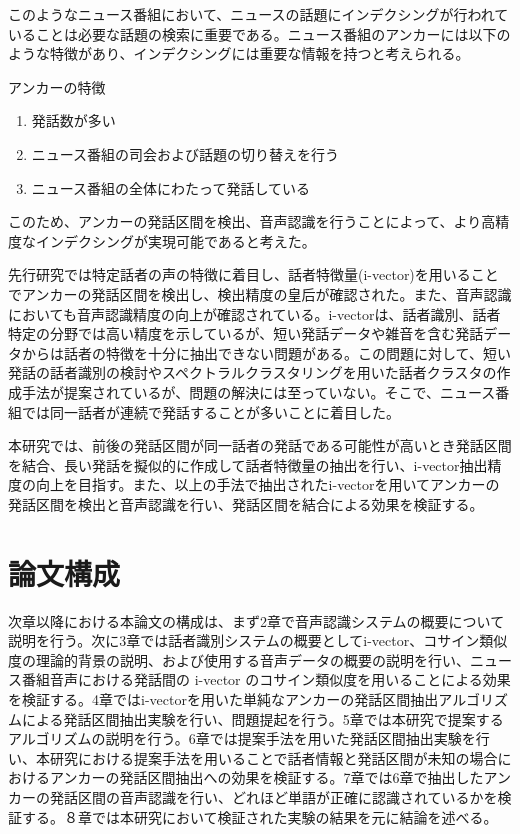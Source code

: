 このようなニュース番組において、ニュースの話題にインデクシングが行われていることは必要な話題の検索に重要である。ニュース番組のアンカーには以下のような特徴があり、インデクシングには重要な情報を持つと考えられる。\newline

アンカーの特徴
\begin{enumerate}
\item 発話数が多い
\item ニュース番組の司会および話題の切り替えを行う
\item ニュース番組の全体にわたって発話している
\end{enumerate}\par

このため、アンカーの発話区間を検出、音声認識を行うことによって、より高精度なインデクシングが実現可能であると考えた。\par
先行研究では特定話者の声の特徴に着目し、話者特徴量(i-vector)を用いることでアンカーの発話区間を検出し、検出精度の皇后が確認された。また、音声認識においても音声認識精度の向上が確認されている。i-vectorは、話者識別、話者特定の分野では高い精度を示しているが、短い発話データや雑音を含む発話データからは話者の特徴を十分に抽出できない問題がある。この問題に対して、短い発話の話者識別の検討\cite{panaiv}やスペクトラルクラスタリングを用いた話者クラスタの作成手法\cite{spectroclus}が提案されているが、問題の解決には至っていない。そこで、ニュース番組では同一話者が連続で発話することが多いことに着目した。\par
本研究では、前後の発話区間が同一話者の発話である可能性が高いとき発話区間を結合、長い発話を擬似的に作成して話者特徴量の抽出を行い、i-vector抽出精度の向上を目指す。また、以上の手法で抽出されたi-vectorを用いてアンカーの発話区間を検出と音声認識を行い、発話区間を結合による効果を検証する。

\section{論文構成}
次章以降における本論文の構成は、まず2章で音声認識システムの概要について説明を行う。次に3章では話者識別システムの概要としてi-vector、コサイン類似度の理論的背景の説明、および使用する音声データの概要の説明を行い、ニュース番組音声における発話間の i-vector のコサイン類似度を用いることによる効果を検証する。4章ではi-vectorを用いた単純なアンカーの発話区間抽出アルゴリズムによる発話区間抽出実験を行い、問題提起を行う。5章では本研究で提案するアルゴリズムの説明を行う。6章では提案手法を用いた発話区間抽出実験を行い、本研究における提案手法を用いることで話者情報と発話区間が未知の場合におけるアンカーの発話区間抽出への効果を検証する。7章では6章で抽出したアンカーの発話区間の音声認識を行い、どれほど単語が正確に認識されているかを検証する。８章では本研究において検証された実験の結果を元に結論を述べる。

